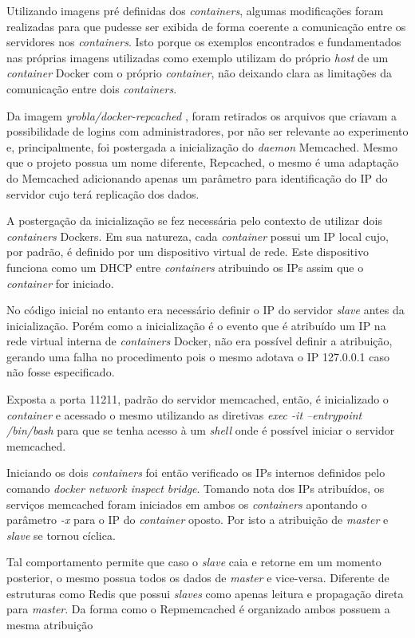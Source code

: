 \documentclass[conference]{IEEEtran}
\begin{document}
Utilizando imagens pré definidas dos \textit{containers}, algumas modificações foram realizadas para que pudesse ser exibida de forma coerente a comunicação entre os servidores nos \textit{containers}. Isto porque os exemplos encontrados e fundamentados nas próprias imagens utilizadas como exemplo utilizam do próprio \textit{host} de um \textit{container} Docker com o próprio \textit{container}, não deixando clara as limitações da comunicação entre dois \textit{containers}.

Da imagem \textit{yrobla/docker-repcached} \cite{yrobla}, foram retirados os arquivos que criavam a possibilidade de logins com administradores, por não ser relevante ao experimento e, principalmente, foi postergada a inicialização do \textit{daemon} Memcached. Mesmo que o projeto possua um nome diferente, Repcached, o mesmo é uma adaptação do Memcached adicionando apenas um parâmetro para identificação do IP do servidor cujo terá replicação dos dados.

A postergação da inicialização se fez necessária pelo contexto de utilizar dois \textit{containers} Dockers. Em sua natureza, cada \textit{container} possui um IP local cujo, por padrão, é definido por um dispositivo virtual de rede. Este dispositivo funciona como um DHCP entre \textit{containers} atribuindo os IPs assim que o \textit{container} for iniciado.

No código inicial no entanto era necessário definir o IP do servidor \textit{slave} antes da inicialização. Porém como a inicialização é o evento que é atribuído um IP na rede virtual interna de \textit{containers} Docker, não era possível definir a atribuição, gerando uma falha no procedimento pois o mesmo adotava o IP 127.0.0.1 caso não fosse especificado.

Exposta a porta 11211, padrão do servidor memcached, então, é inicializado o \textit{container} e acessado o mesmo utilizando as diretivas \textit{exec -it --entrypoint /bin/bash} para que se tenha acesso à um \textit{shell} onde é possível iniciar o servidor memcached. 

Iniciando os dois \textit{containers} foi então verificado os IPs internos definidos pelo comando \textit{docker network inspect bridge}. Tomando nota dos IPs atribuídos, os serviços memcached foram iniciados em ambos os \textit{containers} apontando o parâmetro \textit{-x} para o IP do \textit{container} oposto. Por isto a atribuição de \textit{master} e \textit{slave} se tornou cíclica.

Tal comportamento permite que caso o \textit{slave} caia e retorne em um momento posterior, o mesmo possua todos os dados de \textit{master} e vice-versa. Diferente de estruturas como Redis que possui \textit{slaves} como apenas leitura e propagação direta para \textit{master}. Da forma como o Repmemcached é organizado ambos possuem a mesma atribuição
\end{document}
